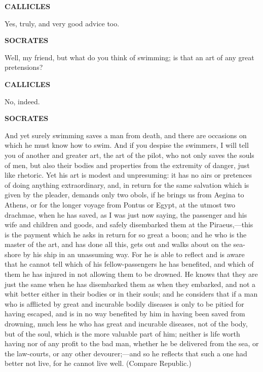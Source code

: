 \documentclass[11pt,letter]{article}
\begin{document}
\par \textbf{CALLICLES}
\par   Yes, truly, and very good advice too.

\par \textbf{SOCRATES}
\par   Well, my friend, but what do you think of swimming; is that an art of any great pretensions?

\par \textbf{CALLICLES}
\par   No, indeed.

\par \textbf{SOCRATES}
\par   And yet surely swimming saves a man from death, and there are occasions on which he must know how to swim. And if you despise the swimmers, I will tell you of another and greater art, the art of the pilot, who not only saves the souls of men, but also their bodies and properties from the extremity of danger, just like rhetoric. Yet his art is modest and unpresuming:  it has no airs or pretences of doing anything extraordinary, and, in return for the same salvation which is given by the pleader, demands only two obols, if he brings us from Aegina to Athens, or for the longer voyage from Pontus or Egypt, at the utmost two drachmae, when he has saved, as I was just now saying, the passenger and his wife and children and goods, and safely disembarked them at the Piraeus,—this is the payment which he asks in return for so great a boon; and he who is the master of the art, and has done all this, gets out and walks about on the sea-shore by his ship in an unassuming way. For he is able to reflect and is aware that he cannot tell which of his fellow-passengers he has benefited, and which of them he has injured in not allowing them to be drowned. He knows that they are just the same when he has disembarked them as when they embarked, and not a whit better either in their bodies or in their souls; and he considers that if a man who is afflicted by great and incurable bodily diseases is only to be pitied for having escaped, and is in no way benefited by him in having been saved from drowning, much less he who has great and incurable diseases, not of the body, but of the soul, which is the more valuable part of him; neither is life worth having nor of any profit to the bad man, whether he be delivered from the sea, or the law-courts, or any other devourer;—and so he reflects that such a one had better not live, for he cannot live well. (Compare Republic.)
\end{document}
